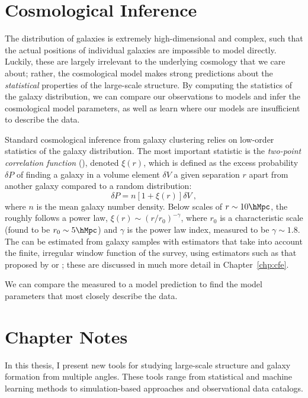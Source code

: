 \section{Cosmological Inference}

The distribution of galaxies is extremely high-dimensional and complex, such that the actual positions of individual galaxies are impossible to model directly.
Luckily, these are largely irrelevant to the underlying cosmology that we care about; rather, the cosmological model makes strong predictions about the \emph{statistical} properties of the large-scale structure.
By computing the statistics of the galaxy distribution, we can compare our observations to models and infer the cosmological model parameters, as well as learn where our models are insufficient to describe the data.

Standard cosmological inference from galaxy clustering relies on low-order statistics of the galaxy distribution. 
The most important statistic is the \emph{two-point correlation function} (\cf), denoted $\xi(r)$, which is defined as the excess probability $\delta P$ of finding a galaxy in a volume element $\delta V$ a given separation $r$ apart from another galaxy compared to a random distribution:
\begin{equation}
    \delta P = n[1+\xi(r)]\delta V ~,
\end{equation}
where $n$ is the mean galaxy number density.
Below scales of $r \sim 10 \hMpc$, the \cf roughly follows a power law, $\xi(r) \sim (r/r_0)^{-\gamma}$, where $r_0$ is a characteristic scale (found to be $r_0 \sim 5 \hMpc$) and $\gamma$ is the power law index, measured to be $\gamma \sim 1.8$.
The \cf can be estimated from galaxy samples with estimators that take into account the finite, irregular window function of the survey, using estimators such as that proposed by \cite{DavisPeebles1983} or \cite{LandySzalay1993}; these are discussed in much more detail in Chapter~\ref{chp:cfe}.

We can compare the measured \cf to a model prediction to find the model parameters that most closely describe the data.




\section{Chapter Notes}

In this thesis, I present new tools for studying large-scale structure and galaxy formation from multiple angles.
These tools range from statistical and machine learning methods to simulation-based approaches and observational data catalogs.

